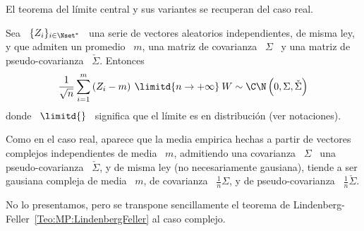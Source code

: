 El teorema del l\'imite central y sus variantes se recuperan del caso real.
%
\begin{teorema}
\label{Teo:MP:CLTComplejo}
%
  Sea  \  $\{  Z_i \}_{i  \in  \Nset^*}$  \  una  serie de  vectores  aleatorios
  independientes, de misma  ley, y que admiten un promedio \  $m$, una matriz de
  covarianza   \   $\Sigma$   \    y   una   matriz   de   pseudo-covarianza   \
  $\check{\Sigma}$. Entonces
  \[
  \frac{1}{\sqrt{n}}  \sum_{i=1}^m  \left( Z_i  -  m  \right)  \: \limitd{n  \to
    +\infty} \: W \sim \C\N\left( 0 , \Sigma , \check{\Sigma} \right)
  \]
  donde  \ $\limitd{}$ \  significa que  el l\'imite  es en  distribuci\'on (ver
  notaciones).
\end{teorema}
%
%
Como en el caso real, aparece que  la media empirica hechas a partir de vectores
complejos independientes de media \  $m$, admitiendo una covarianza \ $\Sigma$ \
una  pseudo-covarianza \  $\check{\Sigma}$, y  de misma  ley  (no necesariamente
gausiana),  tiende a  ser gausiana  compleja  de media  \ $m$,  de covarianza  \
$\frac{1}{n} \Sigma$, y de pseudo-covarianza \ $\frac{1}{n} \check{\Sigma}$.

No   lo   presentamos,  pero   se   transpone   sencillamente   el  teorema   de
Lindenberg-Feller~\ref{Teo:MP:LindenbergFeller} al caso complejo.

